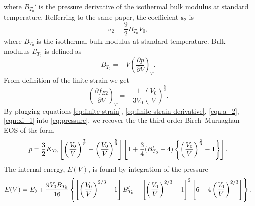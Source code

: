 where $B_{T_0}'$ is the pressure derivative of the isothermal bulk modulus at
standard temperature. Refferring to the same paper, the coefficient $a_2$ is
\begin{equation}
  a_2 = \frac{9}{2} B_{T_0} V_0,
  \label{eqn:a_2}
\end{equation}
where $B_{T_0}$ is the isothermal bulk modulus at standard temperature. Bulk
modulus $B_{T_0}$ is defined as
\begin{equation}
  \label{eqn:bulk-modulus}
  B_{T_0} = -V \left(\frac{\partial p}{\partial V}\right)_T.
\end{equation}
From definition of the finite strain we get
\begin{equation}
  \left(\frac{\partial f_{E2}}{\partial V}\right)_T = - \frac{1}{3 V_0} \left(
    \frac{V_0}{V}
  \right)^{\frac{5}{3}}.
  \label{eq:finite-strain-derivative}
\end{equation}
By plugging equations \eqref{eq:finite-strain},
\eqref{eq:finite-strain-derivative}, \eqref{eqn:a_2}, \eqref{eqn:xi_1} into
\eqref{eq:pressure}, we recover the the third-order Birch--Murnaghan EOS of
the form
\begin{equation}
  \small{p = \frac{3}{2} K_{T_0} \left[
    \left(\frac{V_0}{V}\right)^{\frac{7}{3}}
    - \left(\frac{V_0}{V}\right)^{\frac{5}{3}}
  \right] \left[
    1 + \frac{3}{4}(B_{T_0}' - 4)\left\{
      \left(\frac{V_0}{V}\right)^{\frac{2}{3}} - 1
    \right\}
  \right].}
\end{equation}
The internal energy, $E(V)$, is found by integration of the pressure
\begin{equation}\label{eqn:birch-murnaghan-energy}\scriptsize{
  E(V) = E_0 + \frac{9 V_0 B_{T_0}}{16} \left\{
    \left[\left(\frac{V_0}{V}\right)^{2/3} - 1\right] B_{T_0}' +
    \left[\left(\frac{V_0}{V}\right)^{2/3} - 1\right]^2
    \left[6 - 4 \left(\frac{V_0}{V}\right)^{2/3}\right]
  \right\}.
}\end{equation}

